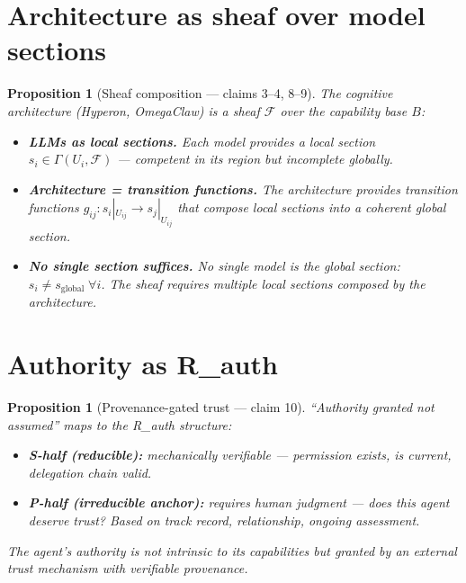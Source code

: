 \documentclass[11pt,a4paper]{article}
\newtheorem{proposition}[definition]{Proposition}
\begin{document}
\section{Architecture as sheaf over model sections}

\begin{proposition}[Sheaf composition --- claims 3--4, 8--9]
\label{prop:sheaf}
The cognitive architecture (Hyperon, OmegaClaw) is a sheaf $\mathcal{F}$
over the capability base $B$:
\begin{itemize}
  \item \textbf{LLMs as local sections.} Each model provides a local
    section $s_i \in \Gamma(U_i, \mathcal{F})$ --- competent in its
    region but incomplete globally.
  \item \textbf{Architecture = transition functions.} The architecture
    provides transition functions $g_{ij}: s_i|_{U_{ij}} \to
    s_j|_{U_{ij}}$ that compose local sections into a coherent global
    section.
  \item \textbf{No single section suffices.} No single model is the
    global section: $s_i \neq s_{\text{global}} \;\forall i$. The sheaf
    requires multiple local sections composed by the architecture.
\end{itemize}
\end{proposition}

\section{Authority as R\_auth}

\begin{proposition}[Provenance-gated trust --- claim 10]
\label{prop:auth}
``Authority granted not assumed'' maps to the R\_auth structure:
\begin{itemize}
  \item \textbf{S-half (reducible):} mechanically verifiable ---
    permission exists, is current, delegation chain valid.
  \item \textbf{P-half (irreducible anchor):} requires human judgment ---
    does this agent deserve trust? Based on track record, relationship,
    ongoing assessment.
\end{itemize}
The agent's authority is not intrinsic to its capabilities but granted
by an external trust mechanism with verifiable provenance.
\end{proposition}


\end{document}
